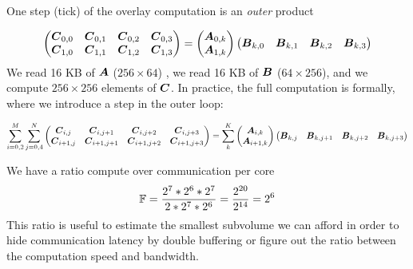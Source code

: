 \documentclass[conference]{IEEEtran}
\begin{document}
One step (tick) of the overlay computation is an {\em outer} product

{\small \begin{equation}
  \label{eq:gemmA}
  \begin{pmatrix}
    \Vc{C}_{0,0}  &  \Vc{C}_{0,1}  & \Vc{C}_{0,2}  &\Vc{C}_{0,3} \\
    \Vc{C}_{1,0}  & \Vc{C}_{1,1}   & \Vc{C}_{1,2}  & \Vc{C}_{1,3} \\
  \end{pmatrix}    =
  \begin{pmatrix}
    \Vc{A}_{0,k}  \\
    \Vc{A}_{1,k}   \\
  \end{pmatrix}  
  \begin{pmatrix}
    \Vc{B}_{k,0}  &  \Vc{B}_{k,1}  & \Vc{B}_{k,2}  &\Vc{B}_{k,3} \\
  \end{pmatrix}    
\end{equation}
} We read 16 KB of ${\boldsymbol A}$ ($256 \times 64$) , we read 16 KB of
${\boldsymbol B}$ ($64 \times 256$), and we compute $256 \times 256$ elements
of ${\boldsymbol C}$. In practice, the full computation is formally, where we
introduce a step in the outer loop:




{\small \begin{equation*}
    \sum_{i=0,2}^M
    \sum_{j=0,4}^N
  \begin{pmatrix}
    {\boldsymbol C}_{i,j}  & {\boldsymbol C}_{i,j+1}    & {\boldsymbol C}_{i,j+2}    &{\boldsymbol C}_{i,j+3} \\
    {\boldsymbol C}_{i+1,j}  & {\boldsymbol C}_{i+1,j+1}   & {\boldsymbol C}_{i+1,j+2}  & {\boldsymbol C}_{i+1,j+3} \\
  \end{pmatrix}    = \sum_k^K
  \begin{pmatrix}
    {\boldsymbol A}_{i,k}  \\
    {\boldsymbol A}_{i+1,k}   \\
  \end{pmatrix}  
  \begin{pmatrix}
    {\boldsymbol B}_{k,j}  &  {\boldsymbol B}_{k,j+1}  & {\boldsymbol B}_{k,j+2}  &{\boldsymbol B}_{k,j+3} \\
  \end{pmatrix}    
\end{equation*}
}



We have a ratio compute over communication per core
\begin{equation}
  \label{eq:ratio}
  \F = \frac{2^7 * 2^6 * 2^7 } { 2* 2^7 * 2^6} = \frac{2^{20}}{2^{14}} = 2^6
\end{equation}
This ratio is useful to estimate the smallest subvolume we can afford
in order to hide communication latency by double buffering or figure
out the ratio between the computation speed and bandwidth. 
\end{document}
